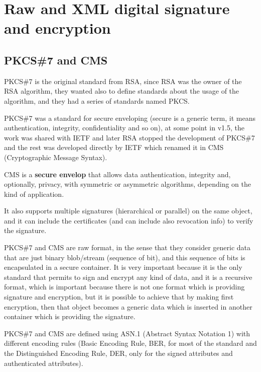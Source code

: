 \chapter{Raw and XML digital signature and encryption}
\section{PKCS\#7 and CMS}
PKCS\#7 is the original standard from RSA, since RSA was the owner of
the RSA algorithm, they wanted also to define standards about the
usage of the algorithm, and they had a series of standards named PKCS.

PKCS\#7 was a standard for secure enveloping (secure is a generic
term, it means authentication, integrity, confidentiality and so on),
at some point in v1.5, the work was shared with IETF and later RSA
stopped the development of PKCS\#7 and the rest was developed directly
by IETF which renamed it in CMS (Cryptographic Message Syntax).

\begin{boxH}
  CMS is a \textbf{secure envelop} that allows data authentication,
  integrity and, optionally, privacy, with symmetric or asymmetric
  algorithms, depending on the kind of application.
\end{boxH}

It also supports multiple signatures (hierarchical or parallel) on the
same object, and it can include the certificates (and can include also
revocation info) to verify the signature.

PKCS\#7 and CMS are raw format, in the sense that they consider
generic data that are just binary blob/stream (sequence of bit), and
this sequence of bits is encapsulated in a secure container. It is
very important because it is the only standard that permits to sign
and encrypt any kind of data, and it is a recursive format, which is
important because there is not one format which is providing signature
and encryption, but it is possible to achieve that by making first
encryption, then that object becomes a generic data which is inserted
in another container which is providing the signature.

PKCS\#7 and CMS are defined using ASN.1 (Abstract Syntax Notation 1)
with different encoding rules (Basic Encoding Rule, BER, for most of
the standard and the Distinguished Encoding Rule, DER, only for the
signed attributes and authenticated attributes).


